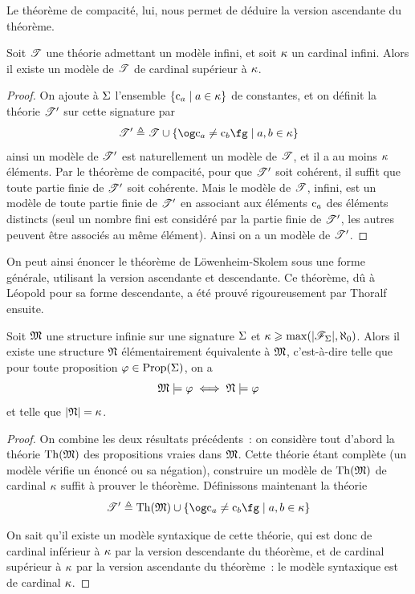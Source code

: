 \noindent
Le théorème de compacité, lui, nous permet de déduire la version ascendante du
théorème.

\begin{theorem}
  Soit $\mathscr T$ une théorie admettant un modèle infini, et
  soit $\kappa$ un cardinal infini. Alors il existe un modèle
  de $\mathscr T$ de cardinal supérieur à $\kappa$.
\end{theorem}

\begin{proof}
  On ajoute à $\Sigma$ l'ensemble $\left\{ \mathrm{c}_a \;\middle\vert\; a \in\kappa \right\}$ de constantes, et
  on définit la théorie $\mathscr T'$ sur cette signature par
  \[\varT'\defeq\varT\cup \compr{\ogM\Cc_a\neq\Cc_b\fgM}{a,b \in \varCk}\]
  ainsi un modèle de $\mathscr T'$ est naturellement un modèle de $\mathscr T$,
  et il a au moins $\kappa$ éléments. Par le théorème de compacité, pour
  que $\mathscr T'$ soit cohérent, il suffit que toute partie finie de
  $\mathscr T'$ soit cohérente. Mais le modèle de $\mathscr T$, infini, est
  un modèle de toute partie finie de $\mathscr T'$ en associant aux éléments
  $\mathrm{c}_a$ des éléments distincts (seul un nombre fini est considéré par la
  partie finie de $\mathscr T'$, les autres peuvent être associés au même élément).
  Ainsi on a un modèle de $\mathscr T'$.
\end{proof}

On peut ainsi énoncer le théorème de Löwenheim-Skolem sous une
forme générale, utilisant la version ascendante et descendante. Ce théorème, dû
à Léopold  pour sa forme descendante, a été prouvé
rigoureusement par Thoralf  ensuite.

\begin{theorem}
  \label{thm.LS}
  Soit $\mathfrak{M}$ une structure infinie sur une signature $\Sigma$ et
  $\kappa \geqslant \max(|\mathscr F_{\Sigma}|,\aleph_0)$. Alors il existe une
  structure $\mathfrak{N}$ élémentairement équivalente à $\mathfrak{M}$,
  c'est-à-dire telle que pour toute proposition $\varphi\in\operatorname{Prop}(\Sigma)$, on a
  \[\mathfrak{M}\models \varphi \iff \mathfrak{N}\models \varphi\]
  et telle que $|\mathfrak{N}| = \kappa$.
\end{theorem}

\begin{proof}
  On combine les deux résultats précédents~: on considère tout d'abord la
  théorie $\operatorname{Th}(\mathfrak{M})$ des propositions vraies dans $\mathfrak{M}$.
  Cette théorie étant complète (un modèle vérifie un énoncé ou sa négation),
  construire un modèle de $\operatorname{Th}(\mathfrak{M})$ de cardinal $\kappa$
  suffit à prouver le théorème. Définissons maintenant la théorie
  \[\varT'\defeq
  \Th(\varMM) \cup\compr{\ogM\Cc_a \neq \Cc_b\fgM}{a,b \in \varCk}\]

  \noindent
  On sait qu'il existe un modèle syntaxique de cette théorie, qui est
  donc de cardinal inférieur à $\kappa$ par la version descendante du
  théorème, et de cardinal supérieur à $\kappa$ par la version ascendante
  du théorème~: le modèle syntaxique est de cardinal $\kappa$.
\end{proof}

